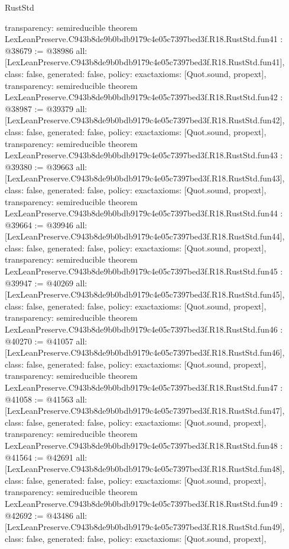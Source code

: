 \begin{lexlean}{RustStd}
\begin{coremodule}
{  transparency: semireducible
}
theorem LexLeanPreserve.C943b8de9b0bdb9179c4e05c7397bed3f.R18.RustStd.fun41 : @38679 := @38986 {
  all: [LexLeanPreserve.C943b8de9b0bdb9179c4e05c7397bed3f.R18.RustStd.fun41],
  class: false,
  generated: false,
  policy: exact{axioms: [Quot.sound, propext]},
  transparency: semireducible
}
theorem LexLeanPreserve.C943b8de9b0bdb9179c4e05c7397bed3f.R18.RustStd.fun42 : @38987 := @39379 {
  all: [LexLeanPreserve.C943b8de9b0bdb9179c4e05c7397bed3f.R18.RustStd.fun42],
  class: false,
  generated: false,
  policy: exact{axioms: [Quot.sound, propext]},
  transparency: semireducible
}
theorem LexLeanPreserve.C943b8de9b0bdb9179c4e05c7397bed3f.R18.RustStd.fun43 : @39380 := @39663 {
  all: [LexLeanPreserve.C943b8de9b0bdb9179c4e05c7397bed3f.R18.RustStd.fun43],
  class: false,
  generated: false,
  policy: exact{axioms: [Quot.sound, propext]},
  transparency: semireducible
}
theorem LexLeanPreserve.C943b8de9b0bdb9179c4e05c7397bed3f.R18.RustStd.fun44 : @39664 := @39946 {
  all: [LexLeanPreserve.C943b8de9b0bdb9179c4e05c7397bed3f.R18.RustStd.fun44],
  class: false,
  generated: false,
  policy: exact{axioms: [Quot.sound, propext]},
  transparency: semireducible
}
theorem LexLeanPreserve.C943b8de9b0bdb9179c4e05c7397bed3f.R18.RustStd.fun45 : @39947 := @40269 {
  all: [LexLeanPreserve.C943b8de9b0bdb9179c4e05c7397bed3f.R18.RustStd.fun45],
  class: false,
  generated: false,
  policy: exact{axioms: [Quot.sound, propext]},
  transparency: semireducible
}
theorem LexLeanPreserve.C943b8de9b0bdb9179c4e05c7397bed3f.R18.RustStd.fun46 : @40270 := @41057 {
  all: [LexLeanPreserve.C943b8de9b0bdb9179c4e05c7397bed3f.R18.RustStd.fun46],
  class: false,
  generated: false,
  policy: exact{axioms: [Quot.sound, propext]},
  transparency: semireducible
}
theorem LexLeanPreserve.C943b8de9b0bdb9179c4e05c7397bed3f.R18.RustStd.fun47 : @41058 := @41563 {
  all: [LexLeanPreserve.C943b8de9b0bdb9179c4e05c7397bed3f.R18.RustStd.fun47],
  class: false,
  generated: false,
  policy: exact{axioms: [Quot.sound, propext]},
  transparency: semireducible
}
theorem LexLeanPreserve.C943b8de9b0bdb9179c4e05c7397bed3f.R18.RustStd.fun48 : @41564 := @42691 {
  all: [LexLeanPreserve.C943b8de9b0bdb9179c4e05c7397bed3f.R18.RustStd.fun48],
  class: false,
  generated: false,
  policy: exact{axioms: [Quot.sound, propext]},
  transparency: semireducible
}
theorem LexLeanPreserve.C943b8de9b0bdb9179c4e05c7397bed3f.R18.RustStd.fun49 : @42692 := @43486 {
  all: [LexLeanPreserve.C943b8de9b0bdb9179c4e05c7397bed3f.R18.RustStd.fun49],
  class: false,
  generated: false,
  policy: exact{axioms: [Quot.sound, propext]},
}
\end{coremodule}
\end{lexlean}
